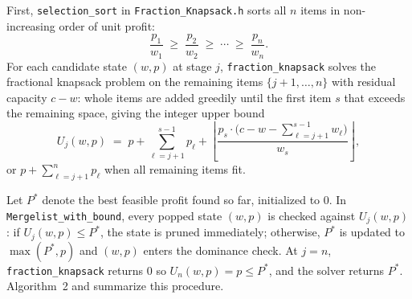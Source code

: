\documentclass[10pt, a4paper]{article}
\newcommand{\code}[1]{\texttt{\color{primary!90!black}#1}}
\begin{document}
First, \code{selection\_sort} in \code{Fraction\_Knapsack.h} sorts all $n$ items in non-increasing order of unit profit:
\begin{equation}
  \frac{p_1}{w_1} \;\ge\; \frac{p_2}{w_2} \;\ge\; \cdots \;\ge\; \frac{p_n}{w_n}.
  \label{eq:ratio_order}
\end{equation}
For each candidate state $(w, p)$ at stage $j$, \code{fraction\_knapsack} solves the fractional knapsack problem on the remaining items $\{j+1, \ldots, n\}$ with residual capacity $c - w$: whole items are added greedily until the first item $s$ that exceeds the remaining space, giving the integer upper bound
\begin{equation}
  U_j(w, p) \;=\; p + \sum_{\ell=j+1}^{s-1} p_\ell + \left\lfloor \frac{p_s \cdot \bigl(c - w - \sum_{\ell=j+1}^{s-1} w_\ell\bigr)}{w_s} \right\rfloor,
  \label{eq:ub}
\end{equation}
or $p + \sum_{\ell=j+1}^{n} p_\ell$ when all remaining items fit.

Let $P^*$ denote the best feasible profit found so far, initialized to $0$. In \code{Mergelist\_with\_bound}, every popped state $(w, p)$ is checked against $U_j(w, p)$: if $U_j(w, p) \le P^*$, the state is pruned immediately; otherwise, $P^*$ is updated to $\max(P^*, p)$ and $(w, p)$ enters the dominance check. At $j = n$, \code{fraction\_knapsack} returns $0$ so $U_n(w, p) = p \le P^*$, and the solver returns $P^*$. Algorithm~2 and  summarize this procedure.
\end{document}
